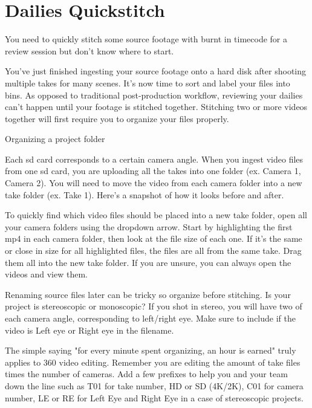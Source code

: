 \chapter{Dailies Quickstitch}
\pagecolor{white}
\label{chap:29}
\begin{fullwidth}

\problem

{\large You need to quickly stitch some source footage with burnt in timecode for a review session but don't know where to start. \par}

You've just finished ingesting your source footage onto a hard disk after shooting multiple takes for many scenes. It's now time to sort and label your files into bins. As opposed to traditional post-production workflow, reviewing your dailies can't happen until your footage is stitched together. Stitching two or more videos together will first require you to organize your files properly.

\solution

{\large Organizing a project folder \par}

Each sd card corresponds to a certain camera angle. When you ingest video files from one sd card, you are uploading all the takes into one folder (ex. Camera 1, Camera 2). You will need to move the video from each camera folder into a new take folder (ex. Take 1). Here's a snapshot of how it looks before and after.


To quickly find which video files should be placed into a new take folder, open all your camera folders using the dropdown arrow. Start by highlighting the first mp4 in each camera folder, then look at the file size of each one. If it's the same or close in size for all highlighted files, the files are all from the same take. Drag them all into the new take folder. If you are unsure, you can always open the videos and view them.

Renaming source files later can be tricky so organize before stitching. Is your project is stereoscopic or monoscopic? If you shot in stereo, you will have two of each camera angle, corresponding to left/right eye. Make sure to include if the video is Left eye or Right eye in the filename.

The simple saying "for every minute spent organizing, an hour is earned" truly applies to 360 video editing. Remember you are editing the amount of take files times the number of cameras. Add a few prefixes to help you and your team down the line such as T01 for take number, HD or SD (4K/2K), C01 for camera number, LE or RE for Left Eye and Right Eye in a case of stereoscopic projects.


\end{fullwidth}
